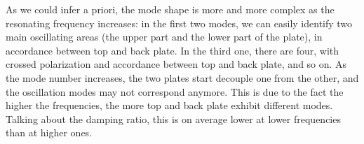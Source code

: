 \documentclass[a4paper,12pt,oneside]{article}
\begin{document}
\begin{figure}[H]
	\begin{center}
	\end{center}
\end{figure}

As we could infer a priori, the mode shape is more and more complex as the resonating frequency increases: in the first two modes, we can easily identify two main oscillating areas (the upper part and the lower part of the plate), in accordance between top and back plate. In the third one, there are four, with crossed polarization and accordance between top and back plate, and so on. As the mode number increases, the two plates start decouple one from the other, and the oscillation modes may not correspond anymore. This is due to the fact the higher the frequencies, the more top and back plate exhibit different modes. Talking about the damping ratio, this is on average lower at lower frequencies than at higher ones.

\end{document}
